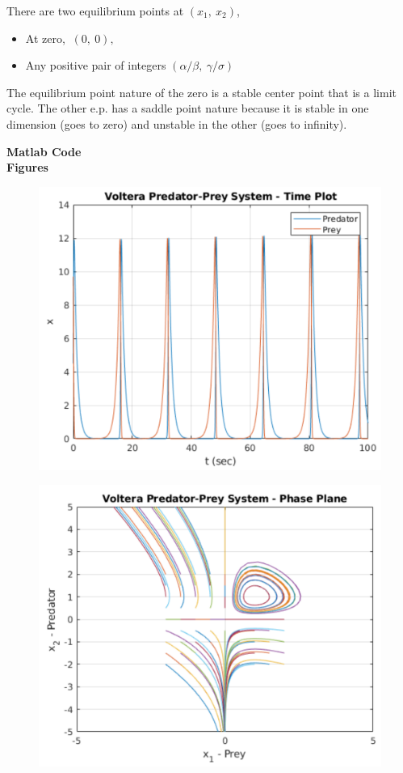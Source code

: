 \documentclass{homeworg}
\begin{document}
There are two equilibrium points at $(x_1,~x_2)$,

\begin{itemize}
  \item At zero, $~(0 ,~ 0),$
  \item Any positive pair of integers $(\alpha/\beta,~\gamma/\sigma)$
\end{itemize}

The equilibrium point nature of the zero is a stable center point that is a
limit cycle. The other e.p. has a saddle point nature because it is stable
in one dimension (goes to zero) and unstable in the other (goes to
infinity).

\newpage
\noindent
\textbf{Matlab Code}\\

\newpage
\noindent
\textbf{Figures}\\
\begin{figure}[h]
  \includegraphics[width=.6\textwidth]{fig001.png}
  \centering
\end{figure}
\begin{figure}[h]
  \includegraphics[width=.6\textwidth]{fig002.png}
  \centering
\end{figure}
\end{document}
